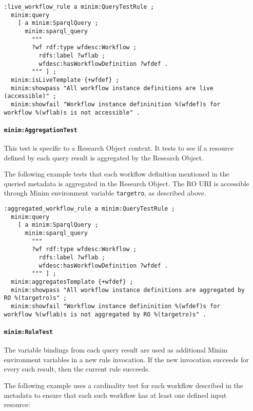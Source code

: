 \documentclass[]{article}
\begin{document}
\begin{verbatim}
:live_workflow_rule a minim:QueryTestRule ;
  minim:query 
    [ a minim:SparqlQuery ; 
      minim:sparql_query 
        """
        ?wf rdf:type wfdesc:Workflow ;
          rdfs:label ?wflab ;
          wfdesc:hasWorkflowDefinition ?wfdef .
        """ ] ;
  minim:isLiveTemplate {+wfdef} ;
  minim:showpass "All workflow instance definitions are live (accessible)" ;
  minim:showfail "Workflow instance defininition %(wfdef)s for workflow %(wflab)s is not accessible" .
\end{verbatim}

\paragraph{\texttt{minim:AggregationTest}}

This test is specific to a Research Object context. It tests to see if a
resource defined by each query result is aggregated by the Research
Object.

The following example tests that each workflow definition mentioned in
the queried metadata is aggregated in the Research Object. The RO URI is
accessible through Minim environment variable \texttt{targetro}, as
described above.

\begin{verbatim}
:aggregated_workflow_rule a minim:QueryTestRule ;
  minim:query 
    [ a minim:SparqlQuery ; 
      minim:sparql_query 
        """
        ?wf rdf:type wfdesc:Workflow ;
          rdfs:label ?wflab ;
          wfdesc:hasWorkflowDefinition ?wfdef .
        """ ] ;
  minim:aggregatesTemplate {+wfdef} ;
  minim:showpass "All workflow instance definitions are aggregated by RO %(targetro)s" ;
  minim:showfail "Workflow instance defininition %(wfdef)s for workflow %(wflab)s is not aggregated by RO %(targetro)s" .
\end{verbatim}

\paragraph{\texttt{minim:RuleTest}}

The variable bindings from each query result are used as additional
Minim environment variables in a new rule invocation. If the new
invocation succeeds for every such result, then the current rule
succeeds.

The following example uses a cardinality test for each workflow
described in the metadata to ensure that each such workflow has at least
one defined input resource:
\end{document}
